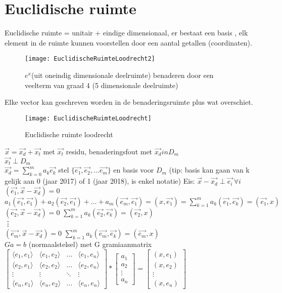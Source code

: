 \section{Euclidische ruimte}
Euclidische ruimte = unitair + eindige dimensionaal, er bestaat een basis , elk element in de ruimte kunnen voorstellen door een aantal getallen (coordinaten).
\begin{figure}[h]
	\centering
	\texttt{[image: EuclidischeRuimteLoodrecht2]}
	\caption{$e^x$(uit oneindig dimensionale deelruimte) benaderen door een veelterm van graad 4 (5 dimensionale deelruimte)}
\end{figure}
Elke vector kan geschreven worden in de benaderingsruimte plus wat overschiet.
\begin{figure}[h]
	\centering
	\texttt{[image: EuclidischeRuimteLoodrecht]}
	\caption{Euclidische ruimte loodrecht}
\end{figure}
$\vec{x}=\vec{x_d}+\vec{x_t}$ met $\vec{x_t}$ residu, benaderingsfout met $\vec{x_d} in D_m$ \\
$\vec{x_t} \perp D_m$ \\
$ \vec{x_d}=\sum_{k=0}^m a_k\vec{e_k} $ stel $\{\vec{e_1},\vec{e_2},\ldots\vec{e_m}\}$ en basis voor $D_m$
(tip: basis kan gaan van k gelijk aan 0 (jaar 2017) of 1 (jaar 2018), is enkel notatie)
Eis:
$\vec{x}-\vec{x_d}\perp \vec{e_i} \,\forall i$ \\
$(\vec{e_1},\vec{x}-\vec{x_d})=0$ $a_1(\vec{e_1},\vec{e_1})+a_2(\vec{e_2},\vec{e_1})+\ldots+a_m(\vec{e_m},\vec{e_1}) = (x,\vec{e_1}) = \sum_{k=1}^m a_k(\vec{e_1},\vec{e_k})=(\vec{e_1},x)$ \\ 
$(\vec{e_2},\vec{x}-\vec{x_d})=0$ $ \sum_{k=1}^m a_k(\vec{e_2},\vec{e_k})=(\vec{e_2},x)$ \\
\vdots \\
$(\vec{e_m},\vec{x}-\vec{x_d})=0$ $ \sum_{k=1}^m a_k(\vec{e_m},\vec{e_k})=(\vec{e_m},x)$ \\
$Ga=b$ (normaalstelsel) met G gramiaanmatrix \\
${\begin{bmatrix}\langle e_{1},e_{1}\rangle &\langle e_{1},e_{2}\rangle &\dots &\langle e_{1},e_{n}\rangle \\\langle e_{2},e_{1}\rangle &\langle e_{2},e_{2}\rangle &\dots &\langle e_{2},e_{n}\rangle \\\vdots &\vdots &\ddots &\vdots \\\langle e_{n},e_{1}\rangle &\langle e_{n},e_{2}\rangle &\dots &\langle e_{n},e_{n}\rangle \end{bmatrix}} * \begin{bmatrix} a_1 \\ a_2 \\ \vdots \\ a_n \end{bmatrix} = \begin{bmatrix} (x,e_1) \\ (x,e_2) \\ \vdots \\ (x,e_n)    \end{bmatrix}  $ \\

